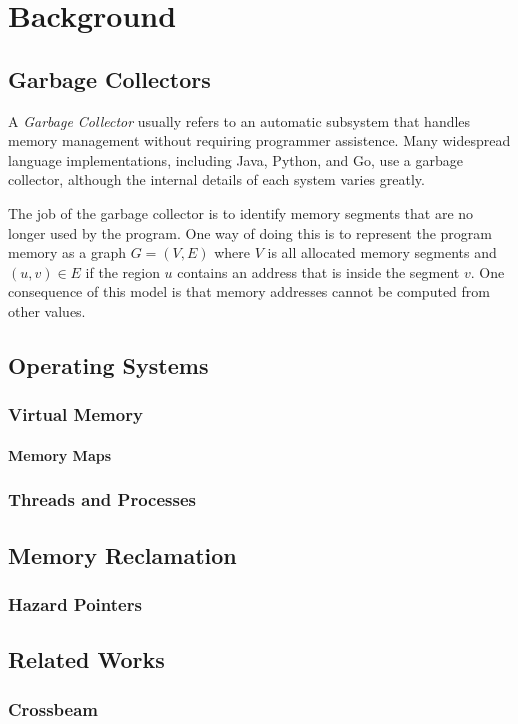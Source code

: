 \chapter{Background}

\section{Garbage Collectors}

A \emph{Garbage Collector} usually refers to an automatic subsystem that handles memory management
without requiring programmer assistence. Many widespread language implementations,
including Java, Python, and Go, use a garbage collector, although the internal details of each
system varies greatly.

The job of the garbage collector is to identify memory segments that are no longer used by the
program. One way of doing this is to represent the program memory as a graph $G=(V, E)$ where $V$ is
all allocated memory segments and $(u, v) \in E$ if the region $u$ contains an address that is
inside the segment $v$. One consequence of this model is that memory addresses cannot be computed
from other values.

\section{Operating Systems}
\blindtext{}

\subsection{Virtual Memory}
\blindtext{}

\subsubsection{Memory Maps\label{sec:memory-map}}
\blindtext{}


\subsection{Threads and Processes}
\blindtext{}


\section{Memory Reclamation}
\blindtext{}

\subsection{Hazard Pointers\label{sec:hazard-pointers}}
\blindtext{}


\section{Related Works}
\blindtext{}

\subsection{Crossbeam}
\blindtext{}
